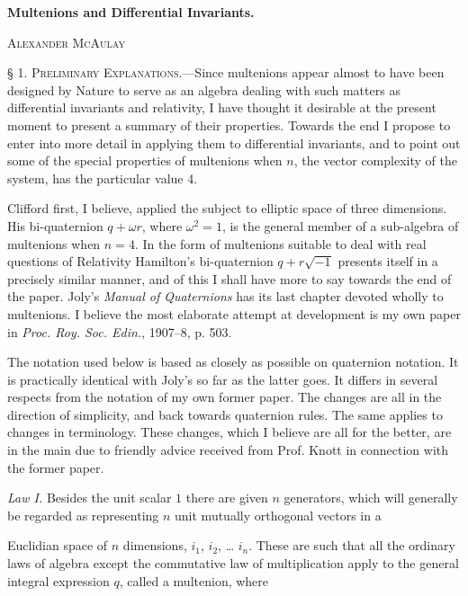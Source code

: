 \documentclass[11pt]{article}
\begin{document}
\newcommand{\unifiedtreatise}{}
\pagestyle{treatise}
\raggedbottom
\thispagestyle{plain}

\begin{center}
  {\Large\bfseries Multenions and Differential Invariants.\par}
\end{center}
\begin{center}\textsc{Alexander McAulay}\end{center}

\noindent\textsc{§ 1. Preliminary Explanations.}---Since multenions appear almost to have been designed by Nature to serve as an algebra dealing with such matters as differential invariants and relativity, I have thought it desirable at the present moment to present a summary of their properties. Towards the end I propose to enter into more detail in applying them to differential invariants, and to point out some of the special properties of multenions when $n$, the vector complexity of the system, has the particular value 4.

\indent Clifford first, I believe, applied the subject to elliptic space of three dimensions. His bi-quaternion $q+\omega r$, where $\omega^2=1$, is the general member of a sub-algebra of multenions when $n=4$. In the form of multenions suitable to deal with real questions of Relativity Hamilton's bi-quaternion $q+r\sqrt{-1}$ presents itself in a precisely similar manner, and of this I shall have more to say towards the end of the paper. Joly's \emph{Manual of Quaternions} has its last chapter devoted wholly to multenions. I believe the most elaborate attempt at development is my own paper in \emph{Proc. Roy. Soc. Edin.}, 1907--8, p. 503.

\indent The notation used below is based as closely as possible on quaternion notation. It is practically identical with Joly's so far as the latter goes. It differs in several respects from the notation of my own former paper. The changes are all in the direction of simplicity, and back towards quaternion rules. The same applies to changes in terminology. These changes, which I believe are all for the better, are in the main due to friendly advice received from Prof. Knott in connection with the former paper.

\indent \emph{Law I.} Besides the unit scalar $1$ there are given $n$ generators, which will generally be regarded as representing $n$ unit mutually orthogonal vectors in a

Euclidian space of $n$ dimensions, $i_1$, $i_2$, \ldots{} $i_n$. These are
such that all the ordinary laws of algebra except the commutative law of
multiplication apply to the general integral expression $q$, called a
multenion, where
\end{document}
